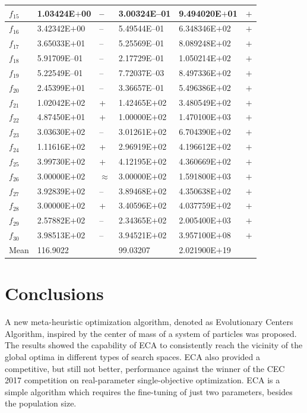 \documentclass{svproc}
\begin{document}
\begin{table}[!ht]
{\begin{tabular}{p{1cm}p{3cm}p{0.5cm}p{3cm}p{2.5cm}p{1.0cm}}
		$f_{15}$ & 1.03424E$+$00  &  --  & 3.00324E--01 & 9.494020E$+$01 & $+$\\ \hline
		$f_{16}$ & 3.42342E$+$00  &  --  & 5.49544E--01 & 6.348346E$+$02 & $+$\\ \hline
		$f_{17}$ & 3.65033E$+$01  &  --  & 5.25569E--01 & 8.089248E$+$02 & $+$\\ \hline
		$f_{18}$ & 5.91709E--01  &  --  & 2.17729E--01 & 1.050214E$+$02 & $+$\\ \hline
		$f_{19}$ & 5.22549E--01  &  --  & 7.72037E--03 & 8.497336E$+$02 & $+$\\ \hline
		$f_{20}$ & 2.45399E$+$01  &  --  & 3.36657E--01 & 5.496386E$+$02 & $+$\\ \hline
		$f_{21}$ & 1.02042E$+$02  &  +  & 1.42465E$+$02 & 3.480549E$+$02 & $+$\\ \hline
		$f_{22}$ & 4.87450E$+$01  &  +  & 1.00000E$+$02 & 1.470100E$+$03 & $+$\\ \hline
		$f_{23}$ & 3.03630E$+$02  &  --  & 3.01261E$+$02 & 6.704390E$+$02 & $+$\\ \hline
		$f_{24}$ & 1.11616E$+$02  &  +  & 2.96919E$+$02 & 4.196612E$+$02 & $+$\\ \hline
		$f_{25}$ & 3.99730E$+$02  &  +  & 4.12195E$+$02 & 4.360669E$+$02 & $+$\\ \hline
		$f_{26}$ & 3.00000E$+$02  &  $\approx$  & 3.00000E$+$02 & 1.591800E$+$03 & $+$\\ \hline
		$f_{27}$ & 3.92839E$+$02  &  --  & 3.89468E$+$02 & 4.350638E$+$02 & $+$\\ \hline
		$f_{28}$ & 3.00000E$+$02  &  +  & 3.40596E$+$02 & 4.037759E$+$02 & $+$\\ \hline
		$f_{29}$ & 2.57882E$+$02  &  --  & 2.34365E$+$02 & 2.005400E$+$03 & $+$\\ \hline
		$f_{30}$ & 3.98513E$+$02  &  --  & 3.94521E$+$02 & 3.957100E$+$08 & $+$\\ \hline
			Mean & 116.9022       &       & 99.03207 &  2.021900E$+$19 \\ \hline
	\end{tabular}
}
\end{table}
%
%
%
\section{Conclusions} %
\label{sec:conclusions}
%
A new meta-heuristic optimization algorithm, denoted as Evolutionary Centers 
Algorithm, inspired by the center of mass of a system of particles was proposed. 
The results showed the capability of ECA to consistently reach the vicinity 
of the global optima in different types of search spaces. ECA also provided 
a competitive, but still not better, performance against the winner of the 
CEC 2017 competition on real-parameter single-objective optimization. ECA 
is a simple algorithm which requires the fine-tuning of just two parameters,  besides the population size.\\
\end{document}
